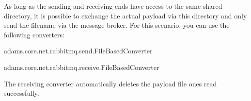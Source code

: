 \documentclass[a4paper]{book}
\begin{document}
As long as the sending and receiving ends have access to the same shared directory,
it is possible to exchange the actual payload via this directory and only send
the filename via the message broker. For this scenario, you can use the following
converters:
\begin{tight_itemize}
  \item adams.core.net.rabbitmq.send.FileBasedConverter
  \item adams.core.net.rabbitmq.receive.FileBasedConverter
\end{tight_itemize}
The receiving converter automatically deletes the payload file ones read
successfully.


\end{document}
